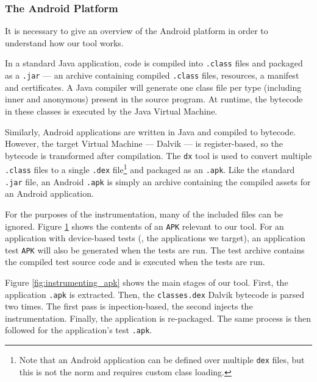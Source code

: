 \subsubsection{The Android Platform}

It is necessary to give an overview of the Android platform in order to understand how our \splatterinst{} tool works.

In a standard Java application, code is compiled into {\tt .class} files and packaged as a {\tt .jar} --- an archive containing compiled {\tt .class} files, resources, a manifest and certificates. A Java compiler will generate one class file per type (including inner and anonymous) present in the source program. At runtime, the bytecode in these classes is executed by the Java Virtual Machine.

Similarly, Android applications are written in Java and compiled to bytecode. However, the target Virtual Machine --- Dalvik --- is register-based, so the bytecode is transformed after compilation. The {\tt dx} tool is used to convert multiple {\tt .class} files to a single {\tt .dex} file\footnote{Note that an Android application can be defined over multiple {\tt dex} files, but this is not the norm and requires custom class loading.} and packaged as an {\tt .apk}. Like the standard {\tt .jar} file, an Android {\tt .apk} is simply an archive containing the compiled assets for an Android application.

For the purposes of the instrumentation, many of the included files can be ignored. Figure \ref{fig:android_apk} shows the contents of an {\tt APK} relevant to our tool. For an application with device-based tests (\ie, the applications we target), an application test {\tt APK} will also be generated when the tests are run. The test archive contains the compiled test source code and is executed when the tests are run.

\begin{figure}[h]
\caption{}
\label{fig:android_apk}
\end{figure}

Figure \ref{fig:instrumenting_apk} shows the main stages of our tool. First, the application {\tt .apk} is extracted. Then, the {\tt classes.dex} Dalvik bytecode is parsed two times. The first pass is inpection-based, the second injects the instrumentation. Finally, the application is re-packaged. The same process is then followed for the application's test {\tt .apk}.

